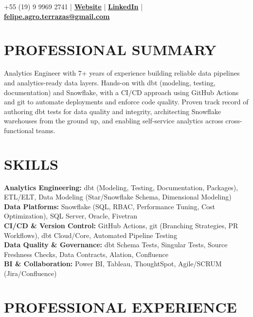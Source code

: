 \documentclass[9pt, letterpaper]{article}
\begin{document}
	\pagestyle{empty}

	 \hfill +55 (19) 9 9969 2741 | \href{https://feliperamiresterrazas.github.io/professionalwebsite/}{\textbf{Website}} | \href{https://www.linkedin.com/in/felipe-ramires-terrazas/}{\textbf{LinkedIn}} |
	\\
	 \hfill \href{mailto:felipe.agro.terrazas@gmail.com}{\textbf{felipe.agro.terrazas@gmail.com}}

	\section*{PROFESSIONAL SUMMARY}
	\noindent Analytics Engineer with 7+ years of experience building reliable data pipelines and analytics-ready data layers. Hands-on with dbt (modeling, testing, documentation) and Snowflake, with a CI/CD approach using GitHub Actions and git to automate deployments and enforce code quality. Proven track record of authoring dbt tests for data quality and integrity, architecting Snowflake warehouses from the ground up, and enabling self-service analytics across cross-functional teams.

	\section*{SKILLS}
	\noindent \textbf{Analytics Engineering:} dbt (Modeling, Testing, Documentation, Packages), ETL/ELT, Data Modeling (Star/Snowflake Schema, Dimensional Modeling) \\
	\noindent \textbf{Data Platforms:} Snowflake (SQL, RBAC, Performance Tuning, Cost Optimization), SQL Server, Oracle, Fivetran \\
	\noindent \textbf{CI/CD \& Version Control:} GitHub Actions, git (Branching Strategies, PR Workflows), dbt Cloud/Core, Automated Pipeline Testing \\
	\noindent \textbf{Data Quality \& Governance:} dbt Schema Tests, Singular Tests, Source Freshness Checks, Data Contracts, Alation, Confluence \\
	\noindent \textbf{BI \& Collaboration:} Power BI, Tableau, ThoughtSpot, Agile/SCRUM (Jira/Confluence)

	\section*{PROFESSIONAL EXPERIENCE}
\end{document}
